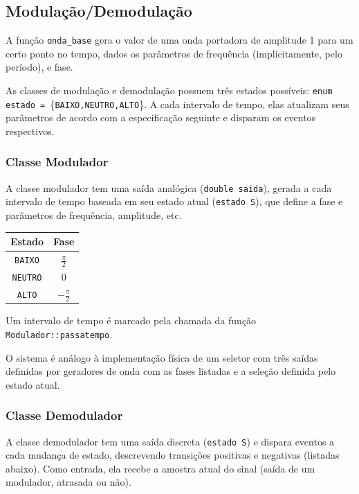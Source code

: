 \documentclass[titlepage,twocolumn]{article}
\begin{document}
\subsection{Modulação/Demodulação}

A função \texttt{onda\_base} gera o valor de uma onda portadora de amplitude 1 para um certo ponto no tempo, dados os parâmetros de frequência (implicitamente, pelo período), e fase.

As classes de modulação e demodulação possuem três estados possíveis: \texttt{enum estado = }\{\texttt{BAIXO,NEUTRO,ALTO}\}. A cada intervalo de tempo, elas atualizam seus parâmetros de acordo com a especificação seguinte e disparam os eventos respectivos.

\subsubsection{Classe Modulador}

A classe modulador tem uma saída analógica (\texttt{double saida}), gerada a cada intervalo de tempo baseada em seu estado atual (\texttt{estado S}), que define a fase e parâmetros de frequência, amplitude, etc.

\begin{center}
    \begin{tabular}{c | c }
        \hline
        Estado & Fase\\
        \hline
        \texttt{BAIXO} & $\frac{\pi}{2}$\\
        \texttt{NEUTRO} & 0\\
        \texttt{ALTO} & $-\frac{\pi}{2}$\\
        \hline
    \end{tabular}
    \label{tab:fasestados}
\end{center}

Um intervalo de tempo é marcado pela chamada da função \texttt{Modulador::passatempo}.

O sistema é análogo à implementação física de um seletor com três saídas definidas por geradores de onda com as fases listadas e a seleção definida pelo estado atual.

\subsubsection{Classe Demodulador}

A classe demodulador tem uma saída discreta (\texttt{estado S}) e dispara eventos a cada mudança de estado, descrevendo transições positivas e negativas (listadas abaixo). Como entrada, ela recebe a amostra atual do sinal (saída de um modulador, atrasada ou não).
\end{document}

